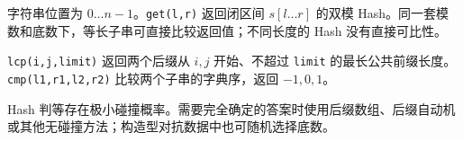 字符串位置为 $0\ldots n-1$。\texttt{get(l,r)} 返回闭区间 $s[l\ldots r]$ 的双模 Hash。同一套模数和底数下，等长子串可直接比较返回值；不同长度的 Hash 没有直接可比性。

\texttt{lcp(i,j,limit)} 返回两个后缀从 $i,j$ 开始、不超过 \texttt{limit} 的最长公共前缀长度。\texttt{cmp(l1,r1,l2,r2)} 比较两个子串的字典序，返回 $-1,0,1$。

Hash 判等存在极小碰撞概率。需要完全确定的答案时使用后缀数组、后缀自动机或其他无碰撞方法；构造型对抗数据中也可随机选择底数。
